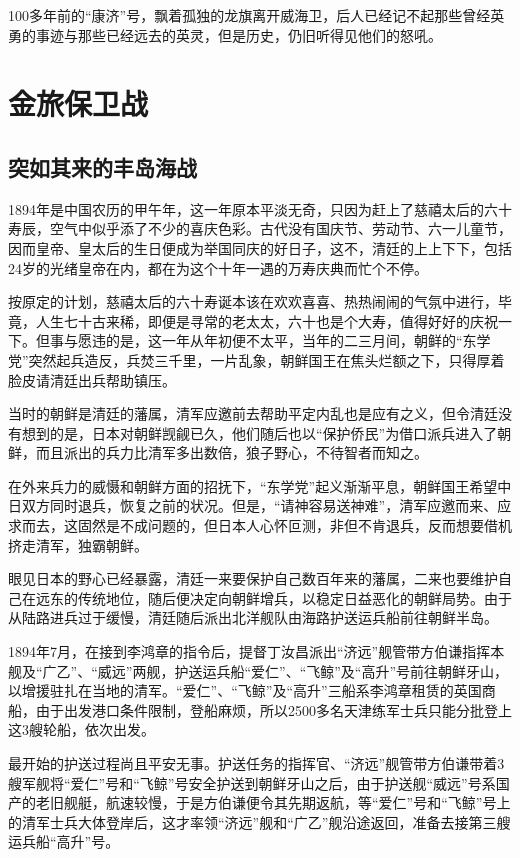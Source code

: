 \documentclass[12pt,UTF8]{ctexbook}
\begin{document}
100多年前的“康济”号，飘着孤独的龙旗离开威海卫，后人已经记不起那些曾经英勇的事迹与那些已经远去的英灵，但是历史，仍旧听得见他们的怒吼。

\mainmatter

\part{金旅保卫战}

\chapter{突如其来的丰岛海战}

1894年是中国农历的甲午年，这一年原本平淡无奇，只因为赶上了慈禧太后的六十寿辰，空气中似乎添了不少的喜庆色彩。古代没有国庆节、劳动节、六一儿童节，因而皇帝、皇太后的生日便成为举国同庆的好日子，这不，清廷的上上下下，包括24岁的光绪皇帝在内，都在为这个十年一遇的万寿庆典而忙个不停。

按原定的计划，慈禧太后的六十寿诞本该在欢欢喜喜、热热闹闹的气氛中进行，毕竟，人生七十古来稀，即便是寻常的老太太，六十也是个大寿，值得好好的庆祝一下。但事与愿违的是，这一年从年初便不太平，当年的二三月间，朝鲜的“东学党”突然起兵造反，兵焚三千里，一片乱象，朝鲜国王在焦头烂额之下，只得厚着脸皮请清廷出兵帮助镇压。

当时的朝鲜是清廷的藩属，清军应邀前去帮助平定内乱也是应有之义，但令清廷没有想到的是，日本对朝鲜觊觎已久，他们随后也以“保护侨民”为借口派兵进入了朝鲜，而且派出的兵力比清军多出数倍，狼子野心，不待智者而知之。

在外来兵力的威慑和朝鲜方面的招抚下，“东学党”起义渐渐平息，朝鲜国王希望中日双方同时退兵，恢复之前的状况。但是，“请神容易送神难”，清军应邀而来、应求而去，这固然是不成问题的，但日本人心怀叵测，非但不肯退兵，反而想要借机挤走清军，独霸朝鲜。

眼见日本的野心已经暴露，清廷一来要保护自己数百年来的藩属，二来也要维护自己在远东的传统地位，随后便决定向朝鲜增兵，以稳定日益恶化的朝鲜局势。由于从陆路进兵过于缓慢，清廷随后派出北洋舰队由海路护送运兵船前往朝鲜半岛。

1894年7月，在接到李鸿章的指令后，提督丁汝昌派出“济远”舰管带方伯谦指挥本舰及“广乙”、“威远”两舰，护送运兵船“爱仁”、“飞鲸”及“高升”号前往朝鲜牙山，以增援驻扎在当地的清军。“爱仁”、“飞鲸”及“高升”三船系李鸿章租赁的英国商船，由于出发港口条件限制，登船麻烦，所以2500多名天津练军士兵只能分批登上这3艘轮船，依次出发。

最开始的护送过程尚且平安无事。护送任务的指挥官、“济远”舰管带方伯谦带着3艘军舰将“爱仁”号和“飞鲸”号安全护送到朝鲜牙山之后，由于护送舰“威远”号系国产的老旧舰艇，航速较慢，于是方伯谦便令其先期返航，等“爱仁”号和“飞鲸”号上的清军士兵大体登岸后，这才率领“济远”舰和“广乙”舰沿途返回，准备去接第三艘运兵船“高升”号。
\end{document}
